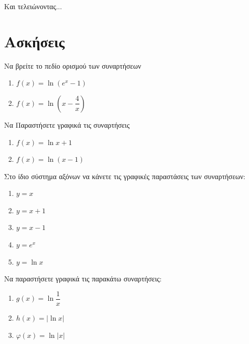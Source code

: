 \documentclass[greek]{beamer}
\begin{document}
\begin{frame}{Και τελειώνοντας...}

\end{frame}

\section{Ασκήσεις}
\begin{askisi}
  Να βρείτε το πεδίο ορισμού των συναρτήσεων
  \begin{enumerate}
    \item<1-> $f(x)=\ln (e^x-1)$
    \item<2-> $f(x)=\ln \left( x-\dfrac{4}{x} \right) $
  \end{enumerate}


\end{askisi}

\begin{askisi}
  Να Παραστήσετε γραφικά τις συναρτήσεις
  \begin{enumerate}
    \item<1-> $f(x)=\ln x+1$
    \item<2-> $f(x)=\ln (x-1)$
  \end{enumerate}


\end{askisi}

\begin{askisi}
  Στο ίδιο σύστημα αξόνων να κάνετε τις γραφικές παραστάσεις των συναρτήσεων:
  \begin{enumerate}
    \item $y=x$
    \item $y=x+1$
    \item $y=x-1$
    \item $y=e^x$
    \item $y=\ln x$
  \end{enumerate}


\end{askisi}

\begin{askisi}
  Να παραστήσετε γραφικά τις παρακάτω συναρτήσεις:
  \begin{enumerate}
    \item<1-> $g(x)=\ln \dfrac{1}{x}$
    \item<2-> $h(x)=|\ln x|$
    \item<3-> $φ(x)=\ln |x|$
  \end{enumerate}


\end{askisi}
\end{document}

